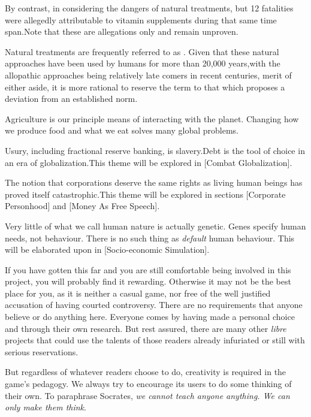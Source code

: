 By contrast, in considering the dangers of natural treatments, but 12 fatalities were allegedly attributable to vitamin supplements during that same time span. Note that these are allegations only and remain unproven. 

Natural treatments are frequently referred to as . Given that these natural approaches have been used by humans for more than 20,000 years,\footnotecite[hardy2012] with the allopathic approaches being relatively late comers in recent centuries, merit of either aside, it is more rational to reserve the term  to that which proposes a deviation from an established norm.


Agriculture is our principle means of interacting with the planet. Changing how we produce food and what we eat solves many global problems.\footnotecite[foodwaste]


Usury, including fractional reserve banking, is slavery. Debt is the tool of choice in an era of globalization.\footnotecite[perkins2005] This theme will be explored in [Combat Globalization].


The notion that corporations deserve the same rights as living human beings has proved itself catastrophic. This theme will be explored in sections \in{}[Corporate Personhood] and \in{}[Money As Free Speech].


Very little of what we call human nature is actually genetic. Genes specify human needs, not behaviour. There is no such thing as {\it default} human behaviour. This will be elaborated upon in [Socio-economic Simulation].
\stopitemize

If you have gotten this far and you are still comfortable being involved in this project, you will probably find it rewarding. Otherwise it may not be the best place for you, as it is neither a casual game, nor free of the well justified accusation of having courted controversy. There are no requirements that anyone believe or do anything here. Everyone comes by having made a personal choice and through their own research. But rest assured, there are many other {\it libre} projects that could use the talents of those readers already infuriated or still with serious reservations.

But regardless of whatever readers choose to do, creativity is required in the game's pedagogy. We always try to encourage its users to do some thinking of their own. To paraphrase Socrates, {\it we cannot teach anyone anything. We can only make them think}.

\StopChapter

